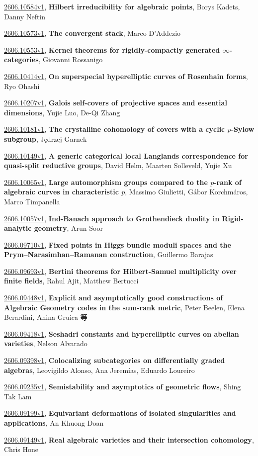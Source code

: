 \documentclass[9pt, a4paper]{article}
\theoremstyle{plain}
\theoremstyle{definition}
\theoremstyle{remark}
\newcommand{\arxiv}[3]{\href{https://arxiv.org/abs/#1}{#1}, \textbf{\textcolor{arxivblue}{#2}}, #3}
\begin{document}
\arxiv{2606.10584v1}{Hilbert irreducibility for algebraic points}{Borys Kadets, Danny Neftin}

\arxiv{2606.10573v1}{The convergent stack}{Marco D'Addezio}

\arxiv{2606.10553v1}{Kernel theorems for rigidly-compactly generated $\infty$-categories}{Giovanni Rossanigo}

\arxiv{2606.10414v1}{On superspecial hyperelliptic curves of Rosenhain forms}{Ryo Ohashi}

\arxiv{2606.10207v1}{Galois self-covers of projective spaces and essential dimensions}{Yujie Luo, De-Qi Zhang}

\arxiv{2606.10181v1}{The crystalline cohomology of covers with a cyclic $p$-Sylow subgroup}{Jędrzej Garnek}

\arxiv{2606.10149v1}{A generic categorical local Langlands correspondence for quasi-split reductive groups}{David Helm, Maarten Solleveld, Yujie Xu}

\arxiv{2606.10065v1}{Large automorphism groups compared to the $p$-rank of algebraic curves in characteristic $p$}{Massimo Giulietti, Gábor Korchmáros, Marco Timpanella}

\arxiv{2606.10057v1}{Ind-Banach approach to Grothendieck duality in Rigid-analytic geometry}{Arun Soor}

\arxiv{2606.09710v1}{Fixed points in Higgs bundle moduli spaces and the Prym--Narasimhan--Ramanan construction}{Guillermo Barajas}

\arxiv{2606.09693v1}{Bertini theorems for Hilbert-Samuel multiplicity over finite fields}{Rahul Ajit, Matthew Bertucci}

\arxiv{2606.09448v1}{Explicit and asymptotically good constructions of Algebraic Geometry codes in the sum-rank metric}{Peter Beelen, Elena Berardini, Anina Gruica 等}

\arxiv{2606.09418v1}{Seshadri constants and hyperelliptic curves on abelian varieties}{Nelson Alvarado}

\arxiv{2606.09398v1}{Colocalizing subcategories on differentially graded algebras}{Leovigildo Alonso, Ana Jeremías, Eduardo Loureiro}

\arxiv{2606.09235v1}{Semistability and asymptotics of geometric flows}{Shing Tak Lam}

\arxiv{2606.09199v1}{Equivariant deformations of isolated singularities and applications}{An Khuong Doan}

\arxiv{2606.09149v1}{Real algebraic varieties and their intersection cohomology}{Chris Hone}
\end{document}
